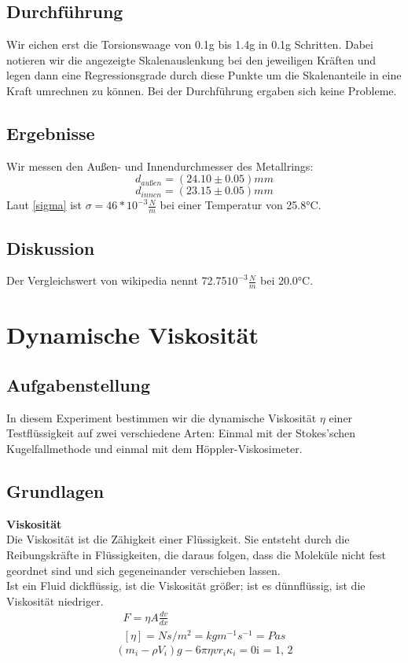 \documentclass{article}
\begin{document}
\subsection{Durchführung}
Wir eichen erst die Torsionswaage von 0.1g bis 1.4g in 0.1g Schritten. Dabei notieren wir die angezeigte Skalenauslenkung bei den jeweiligen Kräften und legen dann eine Regressionsgrade durch diese Punkte um die Skalenanteile in eine Kraft umrechnen zu können.
Bei der Durchführung ergaben sich keine Probleme.
\subsection{Ergebnisse}
Wir messen den Außen- und Innendurchmesser des Metallrings: 
$$d_{außen}=(24.10\pm0.05)mm$$
$$d_{innen}=(23.15\pm0.05)mm$$
Laut \ref{sigma} ist $\sigma=46*10^{-3}\frac{N}{m}$ bei einer Temperatur von 25.8°C. 
\subsection{Diskussion}
Der Vergleichswert von wikipedia nennt 72.75$10^{-3}\frac{N}{m}$ bei 20.0°C.
\section{Dynamische Viskosität}
\subsection{Aufgabenstellung}
In diesem Experiment bestimmen wir die dynamische Viskosität $\eta$ einer Testflüssigkeit auf zwei verschiedene Arten: Einmal mit der Stokes'schen Kugelfallmethode und einmal mit dem Höppler-Viskosimeter.
\subsection{Grundlagen}
\textbf{Viskosität}\\
Die Viskosität ist die Zähigkeit einer Flüssigkeit. Sie entsteht durch die Reibungskräfte in Flüssigkeiten, die daraus folgen, dass die Moleküle nicht fest geordnet sind und sich gegeneinander verschieben lassen.\\
Ist ein Fluid dickflüssig, ist die Viskosität größer; ist es dünnflüssig, ist die Viskosität niedriger.\\
\begin{gather}
F=\eta A \frac{dv}{dx}\\
[\eta]=N s/m^2 = kg m^{-1}s^{-1} = Pa s
\end{gather}
\begin{equation}
(m_i-\rho V_i)g - 6\pi\eta v r_i \kappa_i = 0 \text{i = 1, 2}
\end{equation}
\end{document}
